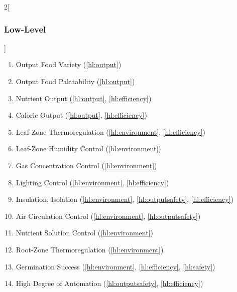 \documentclass{../tex/report}
\begin{document}
\begin{multicols}{2}[\subsubsection{Low-Level}\label{sec:llos}]
    \begin{enumerate}[label=LL\arabic*., ref=LL\arabic*]
        \item \label{ll:output_variety} Output Food Variety                     \hfill (\ref{hl:output})
        \item \label{ll:output_palatability} Output Food Palatability           \hfill (\ref{hl:output})
        \item \label{ll:output_nutrients} Nutrient Output                       \hfill (\ref{hl:output}, \ref{hl:efficiency})
        \item \label{ll:output_energy} Caloric Output                           \hfill (\ref{hl:output}, \ref{hl:efficiency})
        \item \label{ll:control_airtemp} Leaf-Zone Thermoregulation             \hfill (\ref{hl:environment}, \ref{hl:efficiency})
        \item \label{ll:control_airhum} Leaf-Zone Humidity Control              \hfill (\ref{hl:environment})
        \item \label{ll:control_gas} Gas Concentration Control                  \hfill (\ref{hl:environment})
        \item \label{ll:control_light} Lighting Control                         \hfill (\ref{hl:environment}, \ref{hl:efficiency})
        \item \label{ll:insulateisolate} Insulation, Isolation                  \hfill (\ref{hl:environment}, \ref{hl:outputsafety}, \ref{hl:efficiency})
        \item \label{ll:control_aircirculation} Air Circulation Control         \hfill (\ref{hl:environment}, \ref{hl:outputsafety})
        \item \label{ll:control_nutrientsolution} Nutrient Solution Control     \hfill (\ref{hl:environment})
        \item \label{ll:control_roottemp} Root-Zone Thermoregulation            \hfill (\ref{hl:environment})
        \item \label{ll:germinationsuccess} Germination Success                 \hfill (\ref{hl:environment}, \ref{hl:efficiency}, \ref{hl:safety})
        \item \label{ll:automation} High Degree of Automation                   \hfill (\ref{hl:outputsafety}, \ref{hl:efficiency})

\end{enumerate}
\end{multicols}
\end{document}
